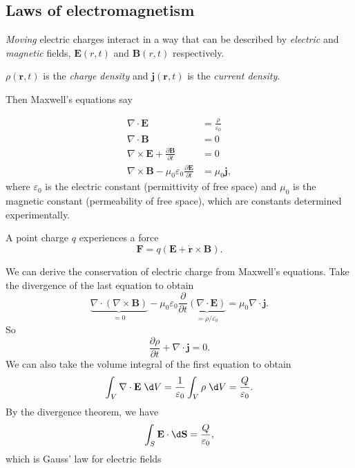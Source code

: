 \documentclass[a4paper]{article}
\begin{document}
\subsection{Laws of electromagnetism}
\begin{defi}
  \emph{Moving} electric charges interact in a way that can be described by \emph{electric} and \emph{magnetic} fields, $\mathbf{E}(r, t)$ and $\mathbf{B}(r, t)$ respectively.
\end{defi}
\begin{notation}
  $\rho(\mathbf{r}, t)$ is the \emph{charge density} and $\mathbf{j}(\mathbf{r}, t)$ is the \emph{current density}.
\end{notation}
Then Maxwell's equations say
\begin{law}
  \begin{align*}
    \nabla\cdot \mathbf{E} &= \frac{\rho}{\varepsilon_0}\\
    \nabla\cdot \mathbf{B} &= 0\\
    \nabla\times \mathbf{E} + \frac{\partial \mathbf{B}}{\partial t} &= 0\\
    \nabla\times \mathbf{B} - \mu_0\varepsilon_0 \frac{\partial \mathbf{E}}{\partial t} &= \mu_0 \mathbf{j},
  \end{align*}
  where $\varepsilon_0$ is the electric constant (permittivity of free space) and $\mu_0$ is the magnetic constant (permeability of free space), which are constants determined experimentally.
\end{law}

\begin{law}
  A point charge $q$ experiences a force
  \[
    \mathbf{F} = q(\mathbf{E} + \dot{\mathbf{r}} \times \mathbf{B}).
  \]
\end{law}

We can derive the conservation of electric charge from Maxwell's equations. Take the divergence of the last equation to obtain
\[
  \underbrace{\nabla\cdot (\nabla\times \mathbf{B})}_{=0} - \mu_0\varepsilon_0\frac{\partial}{\partial t} \underbrace{(\nabla\cdot \mathbf{E})}_{=\rho/\varepsilon_0} = \mu_0 \nabla\cdot \mathbf{j}.
\]
So
\[
  \frac{\partial \rho}{\partial t} + \nabla\cdot \mathbf{j} = 0.
\]
We can also take the volume integral of the first equation to obtain
\[
  \int_V\nabla\cdot \mathbf{E}\;\d V = \frac{1}{\varepsilon_0} \int_V \rho\;\d V = \frac{Q}{\varepsilon_0}.
\]
By the divergence theorem, we have
\[
  \int_S \mathbf{E}\cdot \d \mathbf{S} = \frac{Q}{\varepsilon_0},
\]
which is Gauss' law for electric fields
\end{document}
